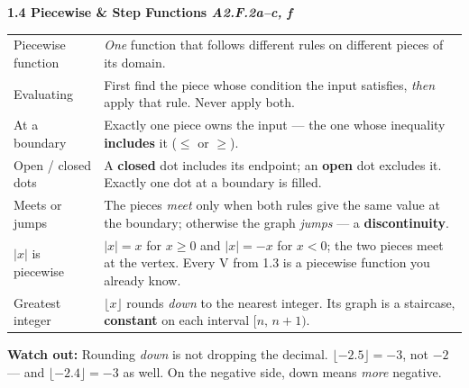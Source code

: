 \documentclass[10pt]{article}
\newcommand{\sghead}[2]{%
  \boxguard[10]%
  \vspace{4pt}\par\noindent
  \colorbox{forest}{\parbox{\dimexpr\linewidth-2\fboxsep}{%
    \small\color{white}\bfseries #1 \hfill \textmd{\itshape\scriptsize\color{forestmid} #2}}}%
  \vspace{2pt}\par}
\newcommand{\sgwatch}[1]{%
  \vspace{1pt}\par\noindent
  \colorbox{redbg}{\parbox{\dimexpr\linewidth-2\fboxsep}{%
    \footnotesize\textbf{\textcolor{redacc}{Watch out:}} #1}}%
  \vspace{1pt}\par}
\newcommand{\sgtabsetup}{\renewcommand{\arraystretch}{1.06}\footnotesize}
\begin{document}
\sghead{1.4 \quad Piecewise \& Step Functions}{A2.F.2a--c, f}
{\sgtabsetup
\begin{tabularx}{\linewidth}{@{} G X @{}}
Piecewise function & \emph{One} function that follows different rules on different pieces of its
  domain. \\
Evaluating & First find the piece whose condition the input satisfies, \emph{then} apply that
  rule. Never apply both. \\
At a boundary & Exactly one piece owns the input --- the one whose inequality \textbf{includes}
  it ($\le$ or $\ge$). \\
Open / closed dots & A \textbf{closed} dot includes its endpoint; an \textbf{open} dot excludes
  it. Exactly one dot at a boundary is filled. \\
Meets or jumps & The pieces \emph{meet} only when both rules give the same value at the boundary;
  otherwise the graph \emph{jumps} --- a \textbf{discontinuity}. \\
$|x|$ is piecewise & $|x|=x$ for $x\ge 0$ and $|x|=-x$ for $x<0$; the two pieces meet at the
  vertex. Every V from 1.3 is a piecewise function you already know. \\
Greatest integer & $\lfloor x\rfloor$ rounds \emph{down} to the nearest integer. Its graph is a
  staircase, \textbf{constant} on each interval $[n,\,n+1)$. \\
\end{tabularx}}
\sgwatch{Rounding \emph{down} is not dropping the decimal. $\lfloor -2.5\rfloor=-3$, not $-2$ ---
and $\lfloor -2.4\rfloor=-3$ as well. On the negative side, down means \emph{more} negative.}
\end{document}

